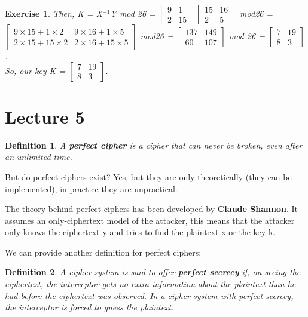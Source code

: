 \documentclass[a4paper, 12pt]{report}
\newtheorem{definition}{\textbf{Definition}}
\newtheorem{exercise}{\textbf{Exercise}}
\begin{document}
\begin{exercise}
	\vspace{5mm}
	Then, K = X$^{-1}$Y mod 26 = $\begin{bmatrix}
	9 & 1\\
	2 & 15	
	\end{bmatrix} \begin{bmatrix}
	15 & 16\\
	2 & 5	
	\end{bmatrix}$ mod26 = $\begin{bmatrix}
	9\times15+1\times2 & 9\times16+1\times5\\
	2\times15+15\times2 & 2\times16+15\times5	
	\end{bmatrix}$ mod26 = $\begin{bmatrix}
	137 & 149 \\
	60 & 107	
	\end{bmatrix}$ mod 26 = $\begin{bmatrix}
	7 & 19\\
	8 & 3	
	\end{bmatrix}$.\\
	
	So, our key K = $\begin{bmatrix}
	7 & 19\\
	8 & 3	
	\end{bmatrix}$.
\end{exercise}

\chapter*{Lecture 5}

\begin{definition}
	A \textbf{perfect cipher} is a cipher that can never be broken, even after an unlimited time.
\end{definition}
But do perfect ciphers exist? Yes, but they are only theoretically (they can be implemented), in practice they are unpractical.

The theory behind perfect ciphers has been developed by \textbf{Claude Shannon}. It assumes an only-ciphertext model of the attacker, this means that the attacker only knows the ciphertext y and tries to find the plaintext x or the key k.

We can provide another definition for perfect ciphers:
\begin{definition}
	A cipher system is said to offer \textbf{perfect secrecy} if, on seeing the ciphertext, the interceptor gets no extra information about the plaintext than he had before the ciphertext was observed. In a cipher system with perfect secrecy, the interceptor is forced to guess the plaintext.
\end{definition}
\end{document}
